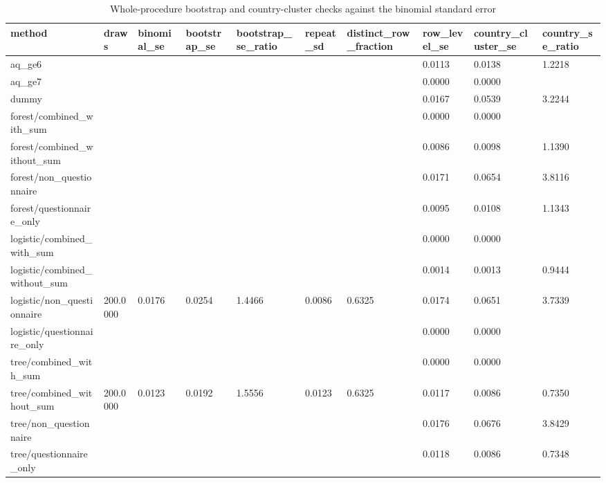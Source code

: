 \begin{table}
\caption{Whole-procedure bootstrap and country-cluster checks against the binomial standard error}
\label{tab:table6_uncertainty_checks}
\begin{tabular}{llllllllll}
\toprule
method & draws & binomial\_se & bootstrap\_se & bootstrap\_se\_ratio & repeat\_sd & distinct\_row\_fraction & row\_level\_se & country\_cluster\_se & country\_se\_ratio \\
\midrule
aq\_ge6 &  &  &  &  &  &  & 0.0113 & 0.0138 & 1.2218 \\
aq\_ge7 &  &  &  &  &  &  & 0.0000 & 0.0000 &  \\
dummy &  &  &  &  &  &  & 0.0167 & 0.0539 & 3.2244 \\
forest/combined\_with\_sum &  &  &  &  &  &  & 0.0000 & 0.0000 &  \\
forest/combined\_without\_sum &  &  &  &  &  &  & 0.0086 & 0.0098 & 1.1390 \\
forest/non\_questionnaire &  &  &  &  &  &  & 0.0171 & 0.0654 & 3.8116 \\
forest/questionnaire\_only &  &  &  &  &  &  & 0.0095 & 0.0108 & 1.1343 \\
logistic/combined\_with\_sum &  &  &  &  &  &  & 0.0000 & 0.0000 &  \\
logistic/combined\_without\_sum &  &  &  &  &  &  & 0.0014 & 0.0013 & 0.9444 \\
logistic/non\_questionnaire & 200.0000 & 0.0176 & 0.0254 & 1.4466 & 0.0086 & 0.6325 & 0.0174 & 0.0651 & 3.7339 \\
logistic/questionnaire\_only &  &  &  &  &  &  & 0.0000 & 0.0000 &  \\
tree/combined\_with\_sum &  &  &  &  &  &  & 0.0000 & 0.0000 &  \\
tree/combined\_without\_sum & 200.0000 & 0.0123 & 0.0192 & 1.5556 & 0.0123 & 0.6325 & 0.0117 & 0.0086 & 0.7350 \\
tree/non\_questionnaire &  &  &  &  &  &  & 0.0176 & 0.0676 & 3.8429 \\
tree/questionnaire\_only &  &  &  &  &  &  & 0.0118 & 0.0086 & 0.7348 \\
\bottomrule
\end{tabular}
\end{table}

